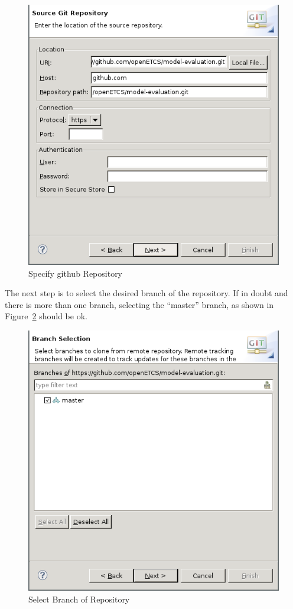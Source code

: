 \documentclass{template/openetcs_article}
\begin{document}
\begin{figure}[H]
  \centering
  \includegraphics[width=\skalierung\textwidth]{project_import_step3}
  \caption{Specify github Repository}
  \label{fig:specify-git-repo}
\end{figure}

The next step is to select the desired branch of the repository. If in doubt and
there is more than one branch, selecting the ``master'' branch, as shown in
Figure~\ref{fig:select-branch} should be ok.

\begin{figure}[H]
  \centering
  \includegraphics[width=\skalierung\textwidth]{project_import_step4}
  \caption{Select Branch of Repository}
  \label{fig:select-branch}
\end{figure}
\end{document}
